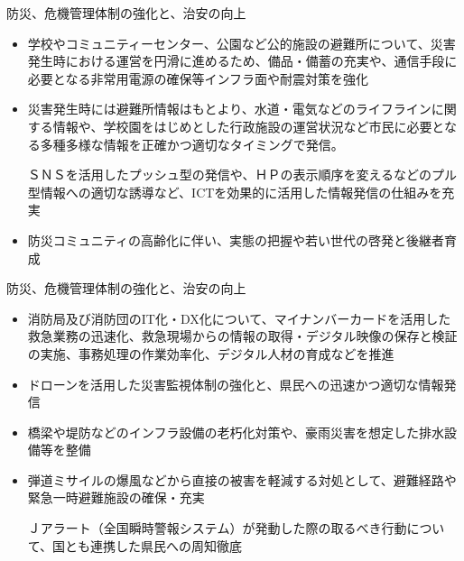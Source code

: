 \documentclass[dvipdfmx]{beamer}
\begin{document}
    \begin{frame}{防災、危機管理体制の強化と、治安の向上}{}
        \begin{small}
            \begin{itemize}
                \setlength{\parsep}{.5mm}
                \setlength{\itemsep}{2mm}
                \item 学校やコミュニティーセンター、公園など公的施設の避難所について、災害発生時における運営を円滑に進めるため、備品・備蓄の充実や、通信手段に必要となる非常用電源の確保等インフラ面や耐震対策を強化
                \item 災害発生時には避難所情報はもとより、水道・電気などのライフラインに関する情報や、学校園をはじめとした行政施設の運営状況など市民に必要となる多種多様な情報を正確かつ適切なタイミングで発信。\par
                ＳＮＳを活用したプッシュ型の発信や、ＨＰの表示順序を変えるなどのプル型情報への適切な誘導など、ICTを効果的に活用した情報発信の仕組みを充実
                \item 防災コミュニティの高齢化に伴い、実態の把握や若い世代の啓発と後継者育成
            \end{itemize}
        \end{small}
    \end{frame}

    \begin{frame}{防災、危機管理体制の強化と、治安の向上}{}
        \begin{small}
            \begin{itemize}
                \setlength{\parsep}{.5mm}
                \setlength{\itemsep}{2mm}
                \item 消防局及び消防団のIT化・DX化について、マイナンバーカードを活用した救急業務の迅速化、救急現場からの情報の取得・デジタル映像の保存と検証の実施、事務処理の作業効率化、デジタル人材の育成などを推進
                \item ドローンを活用した災害監視体制の強化と、県民への迅速かつ適切な情報発信
                \item 橋梁や堤防などのインフラ設備の老朽化対策や、豪雨災害を想定した排水設備等を整備
                \item 弾道ミサイルの爆風などから直接の被害を軽減する対処として、避難経路や緊急一時避難施設の確保・充実\par
                Ｊアラート（全国瞬時警報システム）が発動した際の取るべき行動について、国とも連携した県民への周知徹底
            \end{itemize}
        \end{small}
    \end{frame}
\end{document}
